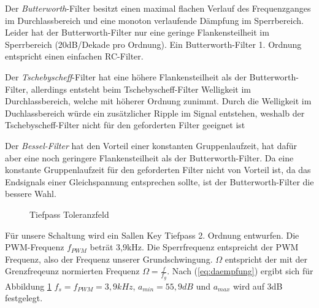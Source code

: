 Der \emph{Butterworth}-Filter besitzt einen maximal flachen Verlauf des Frequenzganges im Durchlassbereich und eine monoton verlaufende Dämpfung im Sperrbereich.
Leider hat der Butterworth-Filter nur eine geringe Flankensteilheit im Sperrbereich (20dB/Dekade pro Ordnung). Ein Butterworth-Filter 1. Ordnung entspricht einen  einfachen RC-Filter.

Der \emph{Tschebyscheff}-Filter hat eine höhere Flankensteilheit als der Butterworth-Filter, allerdings entsteht beim Tschebyscheff-Filter Welligkeit im Durchlassbereich,
welche mit höherer Ordnung zunimmt. Durch die Welligkeit im Duchlassbereich würde ein zusätzlicher Ripple im Signal entstehen, weshalb der Tschebyscheff-Filter nicht
für den geforderten Filter geeignet ist 

Der \emph{Bessel-Filter} hat den Vorteil einer konstanten Gruppenlaufzeit, hat dafür aber eine noch geringere Flankensteilheit als der Butterworth-Filter.
Da eine konstante Gruppenlaufzeit für den geforderten Filter nicht von Vorteil ist, da das Endsignals einer Gleichspannung entsprechen sollte, ist der Butterworth-Filter
die bessere Wahl.


\begin{figure}[H]
\centering
{}
\caption{Tiefpass Toleranzfeld}%
\label{fig:analog}
\end{figure}
Für unsere Schaltung wird ein Sallen Key Tiefpass 2. Ordnung entwurfen. Die PWM-Frequenz $f_{PWM}$ beträt 3,9kHz.
Die Sperrfrequenz entspreicht der PWM Frequenz, also der Frequenz unserer Grundschwingung. $\Omega$ entspricht der mit der Grenzfreqeunz 
normierten Frequenz $\Omega=\frac{f}{f_g}$. Nach (\ref{eq:daempfung}) ergibt sich für Abbildung \ref{fig:analog}
$f_s=f_{PWM}=3,9 kHz$, $a_{min}=55,9 dB$ und $a_{max}$ wird auf 3dB festgelegt.




